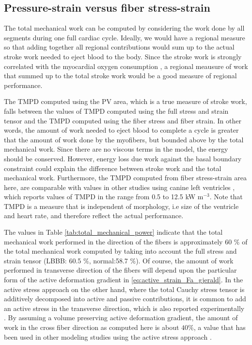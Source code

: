 \subsection{Pressure-strain versus fiber stress-strain}

The total mechanical work can be computed by considering the work done
by all segments during one full cardiac cycle. Ideally, we would have
a regional measure so that adding together all regional contributions
would sum up to the actual stroke work needed to eject blood to the
body. Since the stroke work is strongly correlated with the myocardial
oxygen consumption \cite{suga1979total}, a regional meausure of work
that summed up to the total stroke work would be a good measure of
regional performance. 

The TMPD computed using the PV area, which is a true measure of stroke
work, falls between the values of TMPD computed using the full stress
and strain tensor and the TMPD computed using the fiber stress and
fiber strain. In other words, the amount of work needed to eject blood
to complete a cycle is greater that the amount of work done by the
myofibers, but bounded above by the total mechanical work. Since there
are no viscous terms in the model, the energy should be
conserved. However, energy loss due work against the basal boundary
constraint could explain the difference between stroke work and the
total mechanical work. Furthermore, the TMPD computed from fiber
stress-strain area here, are comparable with values in other studies
using canine left ventricles \cite{delhaas1994regional}, which reports
values of TMPD in the range from 0.5 to 12.5 kW m$^{-3}$. Note that
TMPD is a measure that is independent of morphology, i.e size of the
ventricle and heart rate, and therefore reflect the actual performance.

The values in Table \ref{tab:total_mechanical_power} indicate that the
total mechanical work performed in the direction of the fibers is
approximately 60 $\%$ of the 
total mechanical work computed by taking into account the full stress
and strain tensor (LBBB: 60.5 $\%$, normal:58.7 $\%$). Of course, the
amount of work performed in transverse direction of the fibers will depend upon the
particular form of the active deformation gradient in
\eqref{eq:active_strain_Fa_gjerald}. In the active stress approach on 
the other hand, where the total Cauchy stress tensor is additively decomposed into
active and passive contributions, it is common to add an active stress
in the transverse direction, which is also reported
experimentally \cite{lin1998multiaxial}. By assuming
a volume preserving active deformation gradient, the amount of
work in the cross fiber direction as computed here is about $40 \%$, a
value that has been used in other modeling studies using the active
stress approach \cite{sun2009computationally}.


